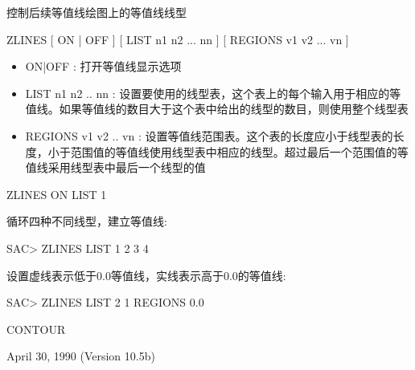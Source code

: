 \label{cmd:zlines}

控制后续等值线绘图上的等值线线型

ZLINES  [ ON | OFF ] [ LIST n1 n2 ... nn ] [ REGIONS v1 v2 ... vn ]

\begin{itemize}
\item ON|OFF : 打开等值线显示选项 
\item LIST n1 n2 .. nn : 设置要使用的线型表，这个表上的每个输入用于相应的等值线。如果等值线的数目大于这个表中给出的线型的数目，则使用整个线型表 
\item REGIONS v1 v2 .. vn : 设置等值线范围表。这个表的长度应小于线型表的长度，小于范围值的等值线使用线型表中相应的线型。超过最后一个范围值的等值线采用线型表中最后一个线型的值
\end{itemize}

ZLINES ON LIST 1

循环四种不同线型，建立等值线:
\begin{SACCode}
SAC> ZLINES LIST 1 2 3 4
\end{SACCode}

设置虚线表示低于0.0等值线，实线表示高于0.0的等值线:
\begin{SACCode}
SAC> ZLINES LIST 2 1 REGIONS 0.0
\end{SACCode}

CONTOUR

April 30, 1990 (Version 10.5b)
